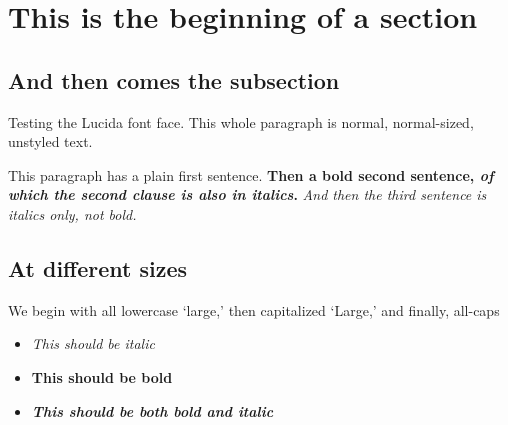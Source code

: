 \documentclass[lucida]{sp}
\begin{document}
\section{This is the beginning of a section}

\subsection{And then comes the subsection}

Testing the Lucida font face. This whole paragraph is normal, normal-sized, unstyled text.

This paragraph has a plain first sentence.
\textbf{Then a bold second sentence, \emph{of which the second clause is also in italics}.}
\emph{And then the third sentence is italics only, not bold.}

\subsection{At different sizes}

{\large We begin with all lowercase `large,' {\Large then capitalized `Large,' {\LARGE and finally, all-caps}}}

\begin{itemize}
  \item \emph{This should be italic}
  \item \textbf{This should be bold}
  \item \emph{\textbf{This should be both bold and italic}}
\end{itemize}
\end{document}
